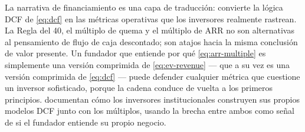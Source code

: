 La narrativa de financiamiento es una capa de traducción: convierte la lógica DCF de
\cref{eq:dcf} en las métricas operativas que los inversores realmente rastrean. La Regla del
40, el múltiplo de quema y el múltiplo de ARR no son alternativas al pensamiento de flujo de
caja descontado; son atajos hacia la misma conclusión de valor presente. Un fundador que
entiende por qué \cref{eq:arr-multiple} es simplemente una versión comprimida de
\cref{eq:ev-revenue} --- que a su vez es una versión comprimida de \cref{eq:dcf} --- puede
defender cualquier métrica que cuestione un inversor sofisticado, porque la cadena conduce
de vuelta a los primeros principios. \textcite{metrick2021venture} documentan cómo los
inversores institucionales construyen sus propios modelos DCF junto con los múltiplos,
usando la brecha entre ambos como señal de si el fundador entiende su propio negocio.
